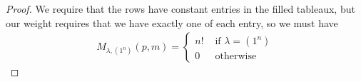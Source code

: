 \documentclass[12pt]{extarticle}
\newcommand{\<}{\langle}
\renewcommand{\>}{\rangle}
\theoremstyle{definition}
\begin{document}
\begin{proof}
  We require that the rows have constant entries in the filled tableaux, but our weight requires that we have exactly one of each entry, so we must have
  \begin{align*}
    M_{\lambda, (1^n)}(p,m) =
    \begin{cases}
      n! & \text{ if } \lambda = (1^n) \\
      0 & \text{ otherwise}
    \end{cases}
  \end{align*}
\end{proof}
\end{document}
